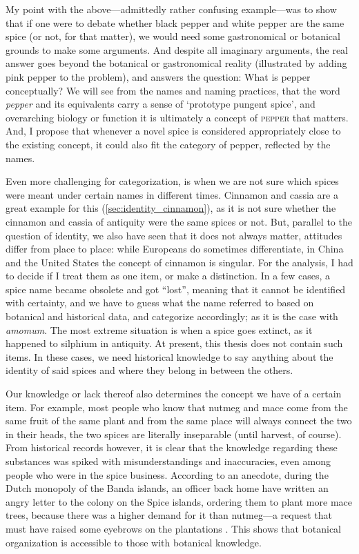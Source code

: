 My point with the above---admittedly rather confusing example---was to show that if one were to debate whether black pepper and white pepper are the same spice (or not, for that matter), we would need some gastronomical or botanical grounds to make some arguments. And despite all imaginary arguments, the real answer goes beyond the botanical or gastronomical reality (illustrated by adding pink pepper to the problem), and answers the question: What is pepper conceptually? We will see from the names and naming practices, that the word \textit{pepper} and its equivalents carry a sense of `prototype pungent spice', and overarching biology or function it is ultimately a concept of \textsc{pepper} that matters. And, I propose that whenever a novel spice is considered appropriately close to the existing concept, it could also fit the category of pepper, reflected by the names.

Even more challenging for categorization, is when we are not sure which spices were meant under certain names in different times. Cinnamon and cassia are a great example for this (\cref{sec:identity_cinnamon}), as it is not sure whether the cinnamon and cassia of antiquity were the same spices or not. But, parallel to the question of identity, we also have seen that it does not always matter, attitudes differ from place to place: while Europeans do sometimes differentiate, in China and the United States the concept of cinnamon is singular. For the analysis, I had to decide if I treat them as one item, or make a distinction. In a few cases, a spice name became obsolete and got ``lost'', meaning that it cannot be identified with certainty, and we have to guess what the name referred to based on botanical and historical data, and categorize accordingly; as it is the case with \textit{amomum}. The most extreme situation is when a spice goes extinct, as it happened to silphium in antiquity. At present, this thesis does not contain such items. In these cases, we need historical knowledge to say anything about the identity of said spices and where they belong in between the others.

Our knowledge or lack thereof also determines the concept we have of a certain item. For example, most people who know that nutmeg and mace come from the same fruit of the same plant and from the same place will always connect the two in their heads, the two spices are literally inseparable (until harvest, of course). From historical records however, it is clear that the knowledge regarding these substances was spiked with misunderstandings and inaccuracies, even among people who were in the spice business. According to an anecdote, during the Dutch monopoly of the Banda islands, an officer back home have written an angry letter to the colony on the Spice islands, ordering them to plant more mace trees, because there was a higher demand for it than nutmeg---a request that must have raised some eyebrows on the plantations \autocite{national_geographic_nutmeg_2014}. This shows that botanical organization is accessible to those with botanical knowledge.

